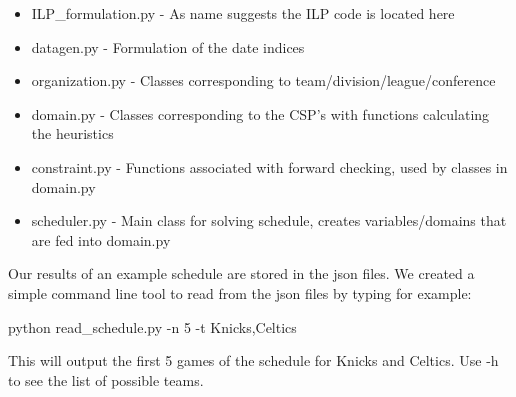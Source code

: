 \documentclass{article}
\begin{document}
	\begin{itemize}
		\item ILP\_formulation.py - As name suggests the ILP code is located here
		\item datagen.py - Formulation of the date indices
		\item organization.py - Classes corresponding to team/division/league/conference
		\item domain.py - Classes corresponding to the CSP's with functions calculating the heuristics
		\item constraint.py - Functions associated with forward checking, used by classes in domain.py
		\item scheduler.py - Main class for solving schedule, creates variables/domains that are fed into domain.py
	\end{itemize}
	Our results of an example schedule are stored in the json files. We created a simple command line tool to read from the json files by typing for example:
	\begin{center}
		python read\_schedule.py -n 5 -t Knicks,Celtics
	\end{center}
	This will output the first 5 games of the schedule for Knicks and Celtics. Use -h to see the list of possible teams.
	
\end{document}
